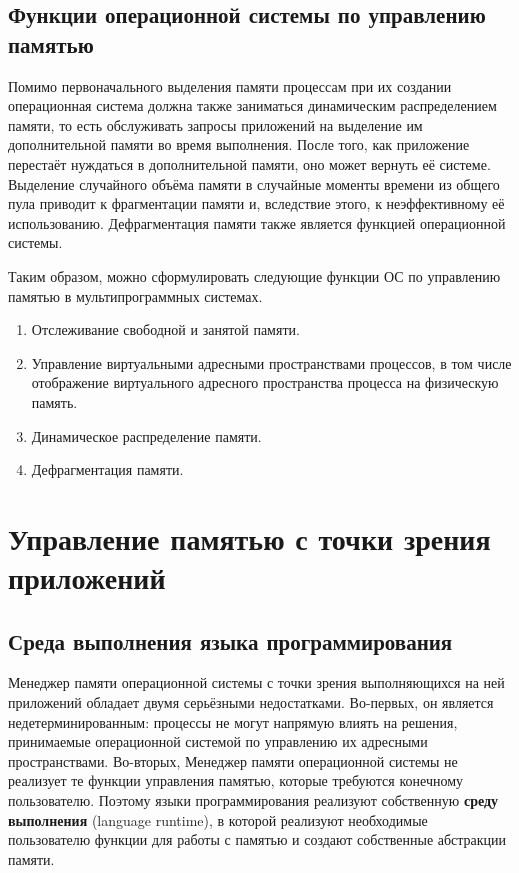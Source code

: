 \subsection{Функции операционной системы по управлению памятью}

Помимо первоначального выделения памяти процессам при их создании операционная система должна также заниматься динамическим распределением памяти, то есть обслуживать запросы приложений на выделение им дополнительной памяти во время выполнения. После того, как приложение перестаёт нуждаться в дополнительной памяти, оно может вернуть её системе. Выделение случайного объёма памяти в случайные моменты времени из общего пула приводит к фрагментации памяти и, вследствие этого, к неэффективному её использованию. Дефрагментация памяти также является функцией операционной системы.

Таким образом, можно сформулировать следующие функции ОС по управлению памятью в мультипрограммных системах.

\begin{enumerate}[label*=\arabic*.]
	\item Отслеживание свободной и занятой памяти.
	\item Управление виртуальными адресными пространствами процессов, в том числе отображение виртуального адресного пространства процесса на физическую память.
	\item Динамическое распределение памяти. 
	\item Дефрагментация памяти. 
\end{enumerate}



\section{Управление памятью с точки зрения приложений}

\subsection{Среда выполнения языка программирования}

Менеджер памяти операционной системы с точки зрения выполняющихся на ней приложений обладает двумя серьёзными недостатками. Во-первых, он является недетерминированным: процессы не могут напрямую влиять на решения, принимаемые операционной системой по управлению их адресными пространствами. Во-вторых, Менеджер памяти операционной системы не реализует те функции управления памятью, которые требуются конечному пользователю. Поэтому языки программирования реализуют собственную \textbf{среду выполнения} (language runtime), в которой реализуют необходимые пользователю функции для работы с памятью и создают собственные абстракции памяти.


